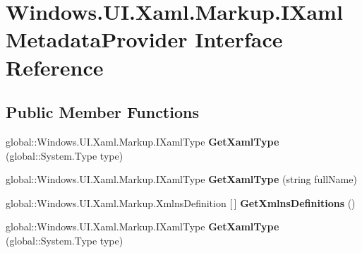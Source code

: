 \hypertarget{interface_windows_1_1_u_i_1_1_xaml_1_1_markup_1_1_i_xaml_metadata_provider}{}\section{Windows.\+U\+I.\+Xaml.\+Markup.\+I\+Xaml\+Metadata\+Provider Interface Reference}
\label{interface_windows_1_1_u_i_1_1_xaml_1_1_markup_1_1_i_xaml_metadata_provider}
\subsection*{Public Member Functions}
\begin{DoxyCompactItemize}
\item 
\mbox{\label{interface_windows_1_1_u_i_1_1_xaml_1_1_markup_1_1_i_xaml_metadata_provider_a377ff409aeef7809629e89922b5c7c04}} 
global\+::\+Windows.\+U\+I.\+Xaml.\+Markup.\+I\+Xaml\+Type {\bfseries Get\+Xaml\+Type} (global\+::\+System.\+Type type)
\item 
\mbox{\label{interface_windows_1_1_u_i_1_1_xaml_1_1_markup_1_1_i_xaml_metadata_provider_ae30d4bd18a8682dafecc626a2d444d1f}} 
global\+::\+Windows.\+U\+I.\+Xaml.\+Markup.\+I\+Xaml\+Type {\bfseries Get\+Xaml\+Type} (string full\+Name)
\item 
\mbox{\label{interface_windows_1_1_u_i_1_1_xaml_1_1_markup_1_1_i_xaml_metadata_provider_a8ae18d0fbda9e17c4168690ffc4d81ee}} 
global\+::\+Windows.\+U\+I.\+Xaml.\+Markup.\+Xmlns\+Definition \mbox{[}$\,$\mbox{]} {\bfseries Get\+Xmlns\+Definitions} ()
\item 
\mbox{\label{interface_windows_1_1_u_i_1_1_xaml_1_1_markup_1_1_i_xaml_metadata_provider_a377ff409aeef7809629e89922b5c7c04}} 
global\+::\+Windows.\+U\+I.\+Xaml.\+Markup.\+I\+Xaml\+Type {\bfseries Get\+Xaml\+Type} (global\+::\+System.\+Type type)
\item 
\mbox{\label{interface_windows_1_1_u_i_1_1_xaml_1_1_markup_1_1_i_xaml_metadata_provider_ae30d4bd18a8682dafecc626a2d444d1f}} 

\end{DoxyCompactItemize}
